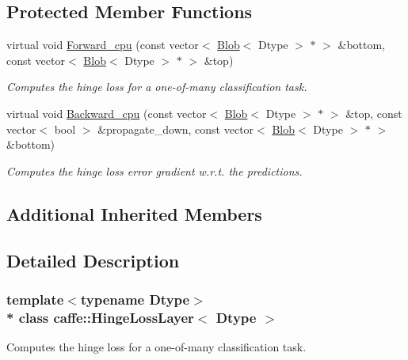 \subsection*{Protected Member Functions}
\begin{DoxyCompactItemize}
\item 
virtual void \hyperlink{classcaffe_1_1HingeLossLayer_a24a8c6e0dca1b35794a14e5f923d226f}{Forward\+\_\+cpu} (const vector$<$ \hyperlink{classcaffe_1_1Blob}{Blob}$<$ Dtype $>$ $\ast$ $>$ \&bottom, const vector$<$ \hyperlink{classcaffe_1_1Blob}{Blob}$<$ Dtype $>$ $\ast$ $>$ \&top)
\begin{DoxyCompactList}\small\item\em Computes the hinge loss for a one-\/of-\/many classification task. \end{DoxyCompactList}\item 
virtual void \hyperlink{classcaffe_1_1HingeLossLayer_a24e8552d75a557b6082c197fd726412e}{Backward\+\_\+cpu} (const vector$<$ \hyperlink{classcaffe_1_1Blob}{Blob}$<$ Dtype $>$ $\ast$ $>$ \&top, const vector$<$ bool $>$ \&propagate\+\_\+down, const vector$<$ \hyperlink{classcaffe_1_1Blob}{Blob}$<$ Dtype $>$ $\ast$ $>$ \&bottom)
\begin{DoxyCompactList}\small\item\em Computes the hinge loss error gradient w.\+r.\+t. the predictions. \end{DoxyCompactList}\end{DoxyCompactItemize}
\subsection*{Additional Inherited Members}


\subsection{Detailed Description}
\subsubsection*{template$<$typename Dtype$>$\\*
class caffe\+::\+Hinge\+Loss\+Layer$<$ Dtype $>$}

Computes the hinge loss for a one-\/of-\/many classification task. 


